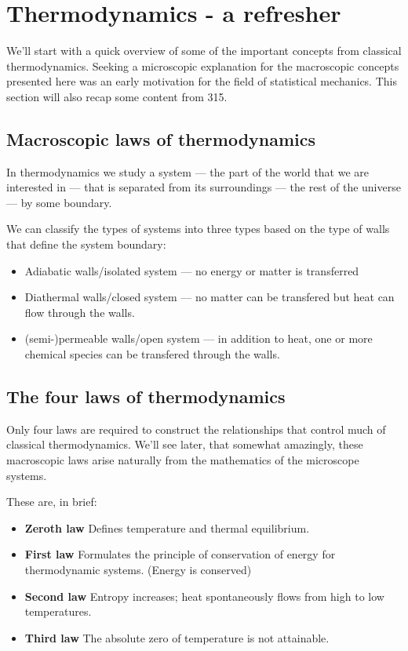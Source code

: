 \section*{Thermodynamics - a refresher}
We'll start with a quick overview of some of the important concepts from classical thermodynamics. Seeking a microscopic explanation for the macroscopic concepts presented here was an early motivation for the field of statistical mechanics. This section will also recap some content from 315.

\subsection*{Macroscopic laws of thermodynamics}
In thermodynamics we study a system --- the part of the world that we are interested in --- that is separated from its surroundings --- the rest of the universe --- by some boundary.

We can classify the types of systems into three types based on the type of walls that define the system boundary:
\begin{itemize}
\item Adiabatic walls/isolated system --- no energy or matter is transferred
\item Diathermal walls/closed system --- no matter can be transfered but heat can flow through the walls.
\item (semi-)permeable walls/open system --- in addition to heat, one or more chemical species can be transfered through the walls. 
\end{itemize}

\subsection*{The four laws of thermodynamics}
Only four laws are required to construct the relationships that control much of classical thermodynamics. We'll see later, that somewhat amazingly, these macroscopic laws arise naturally from the mathematics of the microscope systems. 

These are, in brief:
\begin{itemize}
\item {\bf Zeroth law} Defines temperature and thermal equilibrium.
\item {\bf First law} Formulates the principle of conservation of energy for thermodynamic systems. (Energy is conserved)
\item {\bf Second law} Entropy increases; heat spontaneously flows from high to low temperatures.
\item {\bf Third law} The absolute zero of temperature is not attainable.  
\end{itemize}


